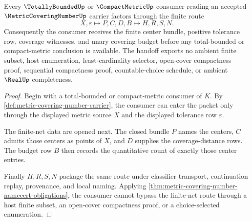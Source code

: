 \begin{theorem}
\label{thm:metric-covering-number-finite-net-handoff}
Every $\TotallyBoundedUp$ or $\CompactMetricUp$ consumer reading an accepted $\MetricCoveringNumberUp$ carrier factors through the finite route
$$
X,\varepsilon \longmapsto P,C,D,B \longmapsto H,R,S,N .
$$
Consequently the consumer receives the finite center bundle, positive tolerance row, coverage witnesses, and unary covering budget before any total-bounded or compact-metric conclusion is available. The handoff exports no ambient finite subset, host enumeration, least-cardinality selector, open-cover compactness proof, sequential compactness proof, countable-choice schedule, or ambient $\RealUp$ completeness.
\end{theorem}
\begin{proof}
Begin with a total-bounded or compact-metric consumer of $K$. By \autoref{def:metric-covering-number-carrier}, the consumer can enter the packet only through the displayed metric source $X$ and the displayed tolerance row $\varepsilon$.

The finite-net data are opened next. The closed bundle $P$ names the centers, $C$ admits those centers as points of $X$, and $D$ supplies the coverage-distance rows. The budget row $B$ then records the quantitative count of exactly those center entries.

Finally $H,R,S,N$ package the same route under classifier transport, continuation replay, provenance, and local naming. Applying \autoref{thm:metric-covering-number-namecert-obligations}, the consumer cannot bypass the finite-net route through a host finite subset, an open-cover compactness proof, or a choice-selected enumeration.
\end{proof}


\begin{closurestatus}{\MetricCoveringNumberUp}
  \theoryclosure{\seedClosure}
  \formalstatus{\unformalizedV}
\end{closurestatus}
